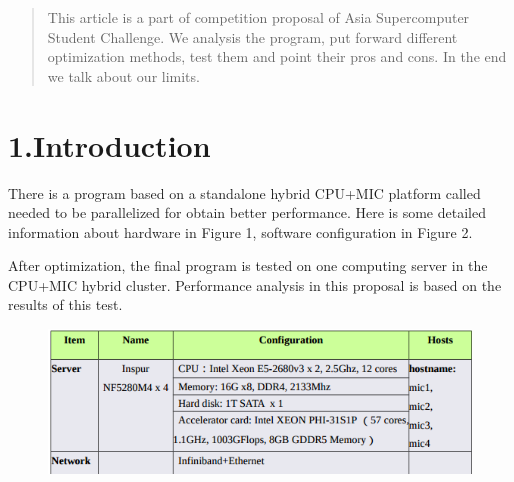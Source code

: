 \documentclass{article}
\begin{document}
\mdxtitleblockstart{}
\mdxauthorstart{}
\mdxauthorend\mdtitleauthorrunning{}{}\mdxtitleblockend%

\begin{abstract}%

\noindent{}This article is a part of competition proposal of Asia Supercomputer Student Challenge. We analysis the  program, put forward different optimization methods, test them and point their pros and cons. In the end we talk about our limits.%
\end{abstract}%

\section{1.\hspace*{0.5em}Introduction}\label{sec-introduction}%

\noindent{}There is a program based on a standalone hybrid CPU+MIC platform called  needed to be parallelized for obtain better performance. Here is some detailed information about hardware in Figure 1, software configuration in Figure 2.%

After optimization, the final program is tested on one computing server in the CPU+MIC hybrid cluster. Performance analysis in this proposal is based on the results of this test.%

\begin{figure}[tbp]%
\begin{mdcenter}%

\noindent{}\includegraphics[keepaspectratio=true,width=\dimmin{}{\dimwidth{0.90}}]{images/2016-02-18-23-01-13-}{}%

\mdhr{}%

\noindent{}%
\end{mdcenter}\label{fig-myfigure}%
\end{figure}%
\end{document}
